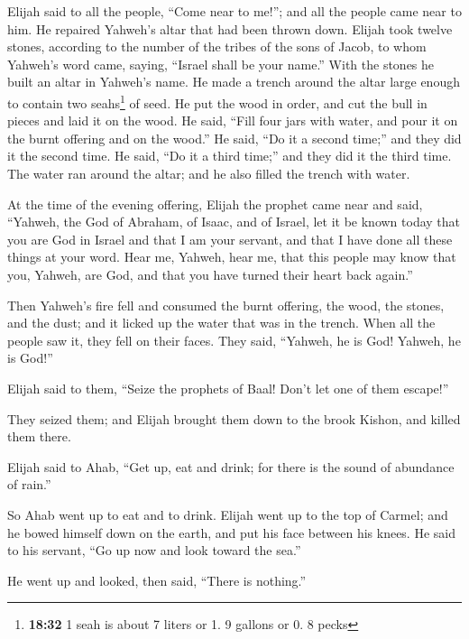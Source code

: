  Elijah said to all the people, ``Come near to me!''; and
all the people came near to him. He repaired Yahweh's altar that had
been thrown down.  Elijah took twelve stones, according
to the number of the tribes of the sons of Jacob, to whom Yahweh's word
came, saying, ``Israel shall be your name.''  With the
stones he built an altar in Yahweh's name. He made a trench around the
altar large enough to contain two seahs\footnote{\textbf{18:32} 1 seah
  is about 7 liters or 1. 9 gallons or 0. 8 pecks} of seed.
 He put the wood in order, and cut the bull in pieces and
laid it on the wood. He said, ``Fill four jars with water, and pour it
on the burnt offering and on the wood.''  He said, ``Do
it a second time;'' and they did it the second time. He said, ``Do it a
third time;'' and they did it the third time.  The water
ran around the altar; and he also filled the trench with water.

 At the time of the evening offering, Elijah the prophet
came near and said, ``Yahweh, the God of Abraham, of Isaac, and of
Israel, let it be known today that you are God in Israel and that I am
your servant, and that I have done all these things at your word.
 Hear me, Yahweh, hear me, that this people may know that
you, Yahweh, are God, and that you have turned their heart back again.''

 Then Yahweh's fire fell and consumed the burnt offering,
the wood, the stones, and the dust; and it licked up the water that was
in the trench.  When all the people saw it, they fell on
their faces. They said, ``Yahweh, he is God! Yahweh, he is God!''

 Elijah said to them, ``Seize the prophets of Baal! Don't
let one of them escape!''

They seized them; and Elijah brought them down to the brook Kishon, and
killed them there.

 Elijah said to Ahab, ``Get up, eat and drink; for there
is the sound of abundance of rain.''

 So Ahab went up to eat and to drink. Elijah went up to
the top of Carmel; and he bowed himself down on the earth, and put his
face between his knees.  He said to his servant, ``Go up
now and look toward the sea.''

He went up and looked, then said, ``There is nothing.''

